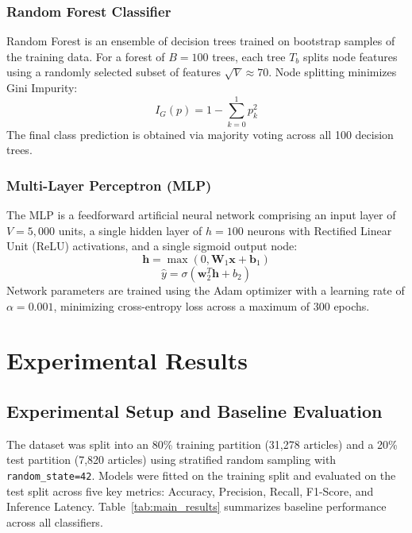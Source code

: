 \documentclass[conference]{IEEEtran}
\begin{document}
\subsubsection{Random Forest Classifier}
Random Forest is an ensemble of decision trees trained on bootstrap samples of the training data. For a forest of $B=100$ trees, each tree $T_b$ splits node features using a randomly selected subset of features $\sqrt{V} \approx 70$. Node splitting minimizes Gini Impurity:
$$I_G(p) = 1 - \sum_{k=0}^{1} p_k^2$$
The final class prediction is obtained via majority voting across all 100 decision trees.

\subsubsection{Multi-Layer Perceptron (MLP)}
The MLP is a feedforward artificial neural network comprising an input layer of $V=5,000$ units, a single hidden layer of $h=100$ neurons with Rectified Linear Unit (ReLU) activations, and a single sigmoid output node:
$$\mathbf{h} = \max(0, \mathbf{W}_1 \mathbf{x} + \mathbf{b}_1)$$
$$\hat{y} = \sigma(\mathbf{w}_2^T \mathbf{h} + b_2)$$
Network parameters are trained using the Adam optimizer with a learning rate of $\alpha=0.001$, minimizing cross-entropy loss across a maximum of 300 epochs.

\section{Experimental Results}

\subsection{Experimental Setup and Baseline Evaluation}
The dataset was split into an 80\% training partition (31,278 articles) and a 20\% test partition (7,820 articles) using stratified random sampling with \texttt{random\_state=42}. Models were fitted on the training split and evaluated on the test split across five key metrics: Accuracy, Precision, Recall, F1-Score, and Inference Latency. Table~\ref{tab:main_results} summarizes baseline performance across all classifiers.
\end{document}
